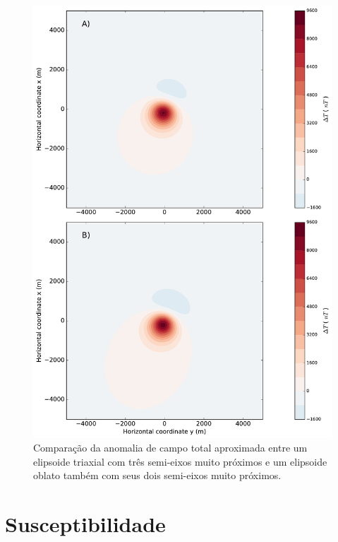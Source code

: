 \begin{figure}[hbt!]
	\centering \includegraphics[width=14.5 cm,height=22 cm]{figures/ellipsoid_triaxial_oblate}
	\caption[Comparação da anomalia de campo total aproximada entre um elipsoide triaxial com três semi-eixos muito próximos 
	e um elipsoide oblato.]{Comparação da anomalia de campo total aproximada entre um elipsoide triaxial com três semi-eixos muito próximos e um elipsoide oblato também com seus dois semi-eixos muito próximos.}
	\label{fig:triaxial_oblate}
\end{figure}

\section{Susceptibilidade}

